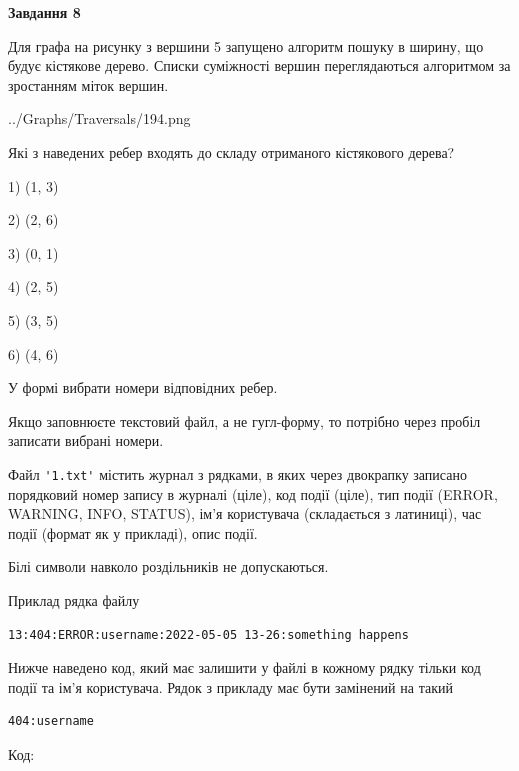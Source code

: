 \documentclass[12pt, ukrainian]{article}
\def\code#1{\Verb!#1!}
\begin{document}
{\begin {large}
{\begin {center}\textbf{Завдання 8}\end {center}}\par
Для графа на рисунку з вершини 5 запущено алгоритм пошуку в ширину, що будує кістякове дерево. Списки суміжності вершин переглядаються алгоритмом за зростанням міток вершин.\par
\begin{center}
	{../Graphs/Traversals/194.png}
\end{center}
\par Які з наведених ребер входять до складу отриманого кістякового дерева?\par
1) (1, 3)\par
2) (2, 6)\par
3) (0, 1)\par
4) (2, 5)\par
5) (3, 5)\par
6) (4, 6)\par
{\vskip 15pt} У формі вибрати номери відповідних ребер.


Якщо заповнюєте текстовий файл, а не гугл-форму, то потрібно через пробіл записа\-ти вибрані номери.\par
\newpage


Файл \code{'1.txt'} містить журнал з рядками, в яких через двокрапку записано поряд\-ко\-вий номер запису в журналі (ціле), код події (ціле), тип події (ERROR, \\WARNING, INFO, STATUS), ім'я користувача (складається з латиниці), час події (фор\-мат як у прикладі), опис події.

Білі символи навколо роздільників не допускаються.

Приклад рядка файлу



\begin{verbatim}
13:404:ERROR:username:2022-05-05 13-26:something happens
\end{verbatim}


Нижче наведено код, який має залишити у файлі в кожному рядку тільки код події та ім'я користувача. Рядок з прикладу має бути замінений на такий



\begin{verbatim}
404:username
\end{verbatim}




Код:




\end{large}}
\end{document}
